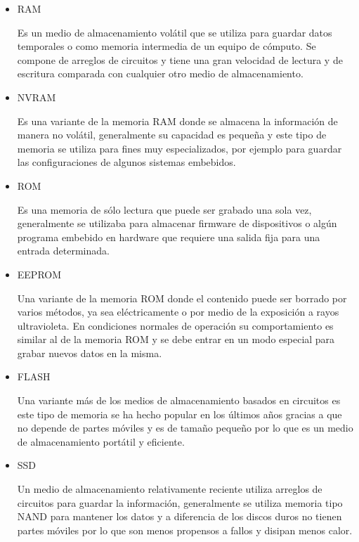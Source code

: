 \begin{itemize}
  \item RAM
  
  Es un medio de almacenamiento vol\'{a}til que se utiliza para guardar datos temporales o como memoria intermedia de un equipo de c\'{o}mputo. Se compone de arreglos de circuitos y tiene una gran velocidad de lectura y de escritura comparada con cualquier otro medio de almacenamiento.
  
  \item NVRAM
  
  Es una variante de la memoria RAM donde se almacena la informaci\'{o}n de manera no vol\'{a}til, generalmente su capacidad es peque\~{n}a y este tipo de memoria se utiliza para fines muy especializados, por ejemplo para guardar las configuraciones de algunos sistemas embebidos.
  
  \item ROM
  
  Es una memoria de s\'{o}lo lectura que puede ser grabado una sola vez, generalmente se utilizaba para almacenar firmware de dispositivos o alg\'{u}n programa embebido en hardware que requiere una salida fija para una entrada determinada.
  
  \item EEPROM
  
  Una variante de la memoria ROM donde el contenido puede ser borrado por varios m\'{e}todos, ya sea el\'{e}ctricamente o por medio de la exposici\'{o}n a rayos ultravioleta. En condiciones normales de operaci\'{o}n su comportamiento es similar al de la memoria ROM y se debe entrar en un modo especial para grabar nuevos datos en la misma.
  
  \item FLASH
  
  Una variante m\'{a}s de los medios de almacenamiento basados en circuitos es este tipo de memoria se ha hecho popular en los \'{u}ltimos a\~{n}os gracias a que no depende de partes m\'{o}viles y es de tama\~{n}o peque\~{n}o por lo que es un medio de almacenamiento port\'{a}til y eficiente.
  
  \item SSD
  
  Un medio de almacenamiento relativamente reciente utiliza arreglos de circuitos para guardar la informaci\'{o}n, generalmente se utiliza memoria tipo NAND para mantener los datos y a diferencia de los discos duros no tienen partes m\'{o}viles por lo que son menos propensos a fallos y disipan menos calor.
  
\end{itemize}

